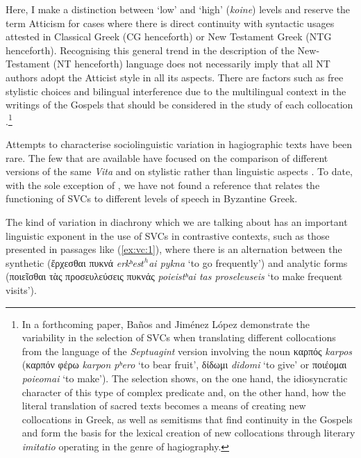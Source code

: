 \documentclass[output=paper,colorlinks,citecolor=brown]{langscibook}
\begin{document}
Here, I make a distinction between `low' and `high' (\emph{koine}) levels and reserve the
term Atticism for cases where there is direct continuity with syntactic usages
attested in Classical Greek (CG henceforth) or New Testament Greek (NTG henceforth).
Recognising this general trend in the description of the New-Testament (NT henceforth) language does not necessarily
imply that all NT authors adopt the Atticist style in all its aspects. There are factors
such as free stylistic choices and bilingual interference due to the multilingual context
in the writings of the Gospels that should be considered in the study of each collocation
\parencites{BanosJoséMiguel-2015534,BanosJoséMiguelandMaríaDoloresJiménezLópezLópez-2017484}.\footnote{In
  a forthcoming paper, Baños and Jiménez López demonstrate the variability in the
  selection of SVCs when translating different collocations from the language of the
  \emph{Septuagint} version involving the noun καρπός \emph{karpos} (καρπόν φέρω
  \emph{karpon pʰero} `to bear fruit', δίδωμι \emph{didomi} `to give' or
  ποιέομαι \emph{poieomai} `to make'). The selection shows, on the one hand, the
  idiosyncratic character of this type of complex predicate and, on the other hand, how
  the literal translation of sacred texts becomes a means of creating new collocations in
  Greek, as well as semitisms that find continuity in the Gospels and form the basis
  for the lexical creation of new collocations through literary \emph{imitatio} operating
  in the genre of hagiography.}

Attempts to characterise sociolinguistic variation in hagiographic texts have been rare.
The few that are available have focused on the comparison of different versions of the
same \emph{Vita} and on stylistic rather than linguistic aspects
\parencites{ZilliacusHerbert-1938377,SchifferElisabeth-1992532,SchifferElisabeth-1999709,FrancoLaura-2009510}.
To date, with the sole exception of \citet{ChurikNikolas-2019727}, we have not found a
reference that relates the functioning of SVCs to different levels of speech in Byzantine
Greek.

The kind of variation in diachrony which we are talking about has an important linguistic
exponent in the use of SVCs in contrastive contexts, such as those presented in passages like (\ref{ex:vc:1}),
where there is an alternation between the synthetic (ἔρχεσθαι πυκνά
\emph{erkʰes$t^h$ai pykna} `to go frequently') and  analytic forms
(ποιεῖσθαι τὰς προσευλεύσεις πυκνάς \emph{poieistʰai tas proseleuseis}
`to make frequent visits').
\end{document}
